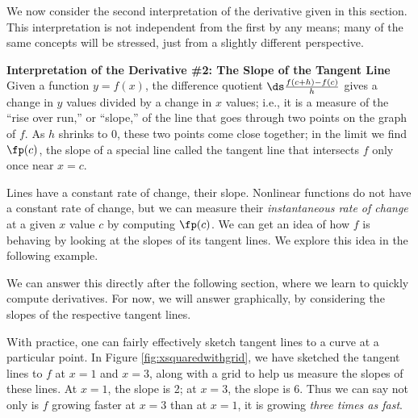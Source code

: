 We now consider the second interpretation of the derivative given in this section. This interpretation is not independent from the first by any means; many of the same concepts will be stressed, just from a slightly different perspective.

\baselineskip
\noindent\textbf{\large Interpretation of the Derivative \#2: The Slope of the Tangent Line}\\

Given a function $y=f(x)$, the difference quotient $\ds \frac{f(c+h)-f(c)}{h}$ gives a change in $y$ values divided by a change in $x$ values; i.e., it is a measure of the ``rise over run,'' or ``slope,'' of the line that goes through two points on the graph of $f$. As $h$ shrinks to 0, these two points come close together; in the limit we find $\fp(c)$, the slope of a special line called the tangent line that intersects $f$ only once near $x=c$.

Lines have a constant rate of change, their slope. Nonlinear functions do not have a constant rate of change, but we can measure their \textit{instantaneous rate of change} at a given $x$ value $c$ by computing $\fp(c)$. We can get an idea of how $f$ is behaving by looking at the slopes of its tangent lines. We explore this idea in the following example.\\

{We can answer this directly after the following section, where we learn to quickly compute derivatives. For now, we will answer graphically, by considering the slopes of the respective tangent lines. 

With practice, one can fairly effectively sketch tangent lines to a curve at a particular point. In Figure \ref{fig:xsquaredwithgrid}, we have sketched the tangent lines to $f$ at $x=1$ and $x=3$, along with a grid to help us measure the slopes of these lines. At $x=1$, the slope is 2; at $x=3$, the slope is 6. Thus we can say not only is $f$ growing faster at $x=3$ than at $x=1$, it is growing \textit{three times as fast}.
}\\



